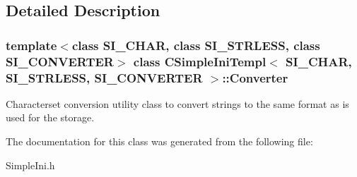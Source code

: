\subsection{Detailed Description}
\subsubsection*{template$<$class S\+I\+\_\+\+C\+H\+AR, class S\+I\+\_\+\+S\+T\+R\+L\+E\+SS, class S\+I\+\_\+\+C\+O\+N\+V\+E\+R\+T\+ER$>$\newline
class C\+Simple\+Ini\+Templ$<$ S\+I\+\_\+\+C\+H\+A\+R, S\+I\+\_\+\+S\+T\+R\+L\+E\+S\+S, S\+I\+\_\+\+C\+O\+N\+V\+E\+R\+T\+E\+R $>$\+::\+Converter}

Characterset conversion utility class to convert strings to the same format as is used for the storage. 

The documentation for this class was generated from the following file\+:\begin{DoxyCompactItemize}
\item 
Simple\+Ini.\+h\end{DoxyCompactItemize}
